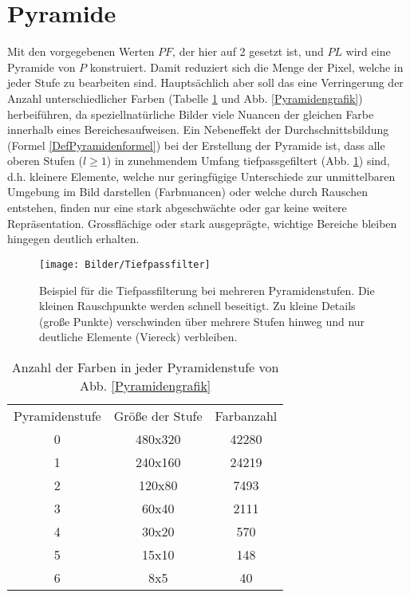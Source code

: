 \section{Pyramide}
  Mit den vorgegebenen Werten $PF$, der hier auf 2 gesetzt ist, und $PL$ wird eine Pyramide von $P$ konstruiert. Damit reduziert sich die Menge der Pixel, welche in jeder Stufe zu bearbeiten sind. Hauptsächlich aber soll das eine Verringerung der Anzahl unterschiedlicher Farben (Tabelle \ref{FarbanzahlenänderungPyramide} und Abb. \ref{Pyramidengrafik}) herbeiführen, da speziell\linebreak natürliche Bilder viele Nuancen der gleichen Farbe innerhalb eines Bereiches\linebreak aufweisen. Ein Nebeneffekt der Durchschnittsbildung (Formel \ref{DefPyramidenformel}) bei der Erstellung der Pyramide ist, dass alle oberen Stufen ($l\geq1$) in zunehmendem Umfang tiefpassgefiltert (Abb. \ref{Tiefpassfilter}) sind, d.h. kleinere Elemente, welche nur geringfügige Unterschiede zur unmittelbaren Umgebung im Bild darstellen (Farbnuancen) oder welche durch Rauschen entstehen, finden nur eine stark abgeschwächte oder gar keine weitere Repräsentation. Grossflächige oder stark ausgeprägte, wichtige Bereiche bleiben hingegen deutlich erhalten. \cite{Jaehne2002, Li2003a, Jung2007}
  \begin{figure}[!t]
    \centering
    \texttt{[image: Bilder/Tiefpassfilter]}
    \caption{Beispiel für die Tiefpassfilterung bei mehreren Pyramidenstufen. Die kleinen Rauschpunkte werden schnell beseitigt. Zu kleine Details (große Punkte) verschwinden über mehrere Stufen hinweg und nur deutliche Elemente (Viereck) verbleiben.}
    \label{Tiefpassfilter}
  \end{figure}

  \begin{table}
    \centering
    \begin{tabular}{ccc}\label{FarbanzahlenänderungPyramide}
      Pyramidenstufe & Größe der Stufe & Farbanzahl\\
      0	&	480x320	&	42280\\
      1	&	240x160	&	24219\\
      2	&	120x80	&	7493\\
      3	&	60x40	&	2111\\
      4	&	30x20	&	570\\
      5	&	15x10	&	148\\
      6	&	8x5	&	40\\
    \end{tabular}
    \caption{Anzahl der Farben in jeder Pyramidenstufe von Abb. \ref{Pyramidengrafik}}
  \end{table}

